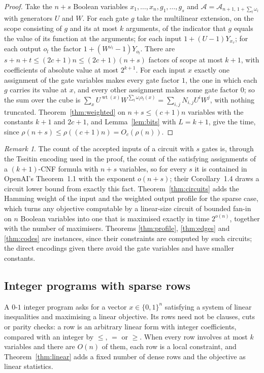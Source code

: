\documentclass[11pt,reqno]{amsart}
\numberwithin{equation}{section}
\theoremstyle{plain}
\theoremstyle{definition}
\theoremstyle{remark}
\newtheorem{remark}[theorem]{Remark}
\newcommand{\A}{\mathcal{A}}
\newcommand{\rhon}{\rho}
\newcommand{\oai}{OpenAI}
\begin{document}
\begin{proof}
Take the $n+s$ Boolean variables $x_1,\dots,x_n,g_1,\dots,g_s$ and
$\A=\A_{n+1,\,1+\sum_l\omega_l}$ with generators $U$ and $W$. For each gate $g$
take the multilinear extension, on the scope consisting of $g$ and its at most
$k$ arguments, of the indicator that $g$ equals the value of its function at the
arguments; for each input $1+(U-1)Y_{x_v}$; for each output $o_l$ the factor
$1+(W^{\omega_l}-1)Y_{o_l}$. There are $s+n+t\le(2c+1)n\le(2c+1)(n+s)$ factors of
scope at most $k+1$, with coefficients of absolute value at most $2^{k+1}$. For
each input $x$ exactly one assignment of the gate variables makes every gate
factor $1$, the one in which each $g$ carries its value at $x$, and every other
assignment makes some gate factor $0$; so the sum over the cube is
$\sum_xU^{\operatorname{wt}(x)}W^{\sum_l\omega_lo_l(x)}=\sum_{i,j}N_{i,j}U^{i}W^{j}$,
with nothing truncated. Theorem~\ref{thm:weighted} on $n+s\le(c+1)n$ variables
with the constants $k+1$ and $2c+1$, and Lemma~\ref{lem:bits} with $L=k+1$,
give the time, since $\rhon(n+s)\le\rhon((c+1)n)=O_c(\rhon(n))$.
\end{proof}

\begin{remark}
The count of the accepted inputs of a circuit with $s$ gates is, through the
Tseitin encoding used in the proof, the count of the satisfying assignments of a
$(k+1)$-CNF formula with $n+s$ variables, so for every $s$ it is contained in
\oai{}'s Theorem~1.1 with the exponent $o(n+s)$; their Corollary~1.4 draws a
circuit lower bound from exactly this fact. Theorem~\ref{thm:circuits} adds the
Hamming weight of the input and the weighted output profile for the sparse
case, which turns any objective computable by a linear-size circuit of bounded
fan-in on $n$ Boolean variables into one that is maximised exactly in time
$2^{o(n)}$, together with the number of maximisers. Theorems \ref{thm:profile},
\ref{thm:edges} and \ref{thm:codes} are instances, since their constraints are
computed by such circuits; the direct encodings given there avoid the gate
variables and have smaller constants.
\end{remark}

\subsection{Integer programs with sparse rows}\label{ssec:ip}
A $0$-$1$ integer program asks for a vector $x\in\{0,1\}^n$ satisfying a system
of linear inequalities and maximising a linear objective. Its rows need not
be clauses, cuts or parity checks: a row is an arbitrary linear form with
integer coefficients, compared with an integer by $\le$, $=$ or $\ge$. When
every row involves at most $k$ variables and there are $O(n)$ of them, each row
is a local constraint, and Theorem~\ref{thm:linear} adds a fixed number of
dense rows and the objective as linear statistics.
\end{document}
